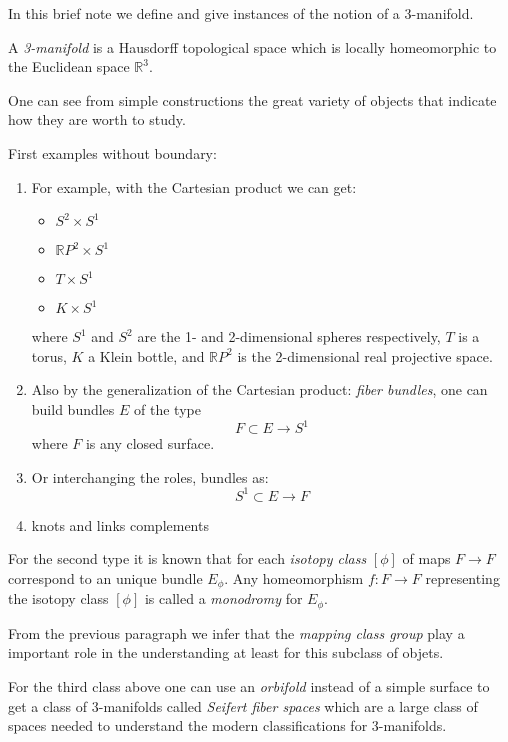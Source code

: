 \documentclass[12pt]{article}
\begin{document}
In this brief note we define and give instances of the notion of a 3-manifold.

A \emph{3-manifold} is a Hausdorff topological space which is locally homeomorphic to the Euclidean space ${\mathbb{R}}^3$.

One can see from simple constructions the great variety of objects that indicate how they are worth to study.

First examples without boundary:
\begin{enumerate}
\item For example, with the Cartesian product we can get:
\begin{itemize}
\item $S^2\times S^1$
\item ${\mathbb{R}}P^2\times S^1$
\item $T\times S^1$
\item $K\times S^1$
\end{itemize}
where $S^1$ and $S^2$ are the 1- and 2-dimensional spheres respectively, $T$ is a torus, $K$ a Klein bottle, and $\mathbb{R}P^2$ is the 2-dimensional real projective space.

\item Also by the generalization of the Cartesian product: \emph{fiber bundles}, one can build bundles $E$ of the type
$$F\subset E\to S^1$$
where $F$ is any closed surface.

\item Or interchanging the roles, bundles as:
$$S^1\subset E\to F$$

\item knots and links complements
\end{enumerate}

For the second type it is known that for each \emph{isotopy class} $[\phi]$ of maps $F\to F$ correspond to an unique bundle $E_{\phi}$. Any homeomorphism $f:F\to F$ representing the isotopy class $[\phi]$ is called a \emph{monodromy} for $E_{\phi}$.

From the previous paragraph we infer that the \emph{mapping class group} play a important role in the understanding at least for this subclass of objets.

For the third class above one can use an \emph{orbifold} instead of a simple surface to get a class of 3-manifolds called \emph{Seifert fiber spaces} which are a large class of spaces needed to understand the modern classifications for 3-manifolds.
\end{document}
